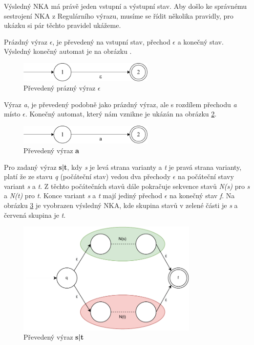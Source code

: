 Výsledný NKA má právě jeden vstupní a výstupní stav. Aby došlo ke správnému sestrojení NKA z Regulárního výrazu, musíme se řídit několika pravidly, pro ukázku si pár těchto pravidel ukážeme.

Prázdný výraz \textit{$\epsilon$}, je převedený na vstupní stav, přechod \textit{$\epsilon$} a konečný stav.
Výsledný konečný automat je na obrázku \label{fig:NFAepsilon}.
\begin{figure}[!h]
	\centering
	\includegraphics[width=0.6\textwidth]{Figures/NFA_epsilon.pdf}
	\caption{Převedený prázný výraz \textbf{$\epsilon$}}
	\label{fig:NFAepsilon}
\end{figure}

Výraz \textit{a}, je převedený podobně jako prázdný výraz, ale s rozdílem přechodu \textit{a} místo \textit{$\epsilon$}.
Konečný automat, který nám vznikne je ukázán na obrázku \ref{fig:NFAa}.
\begin{figure}[!h]
	\centering
	\includegraphics[width=0.6\textwidth]{Figures/NFA_a.pdf}
	\caption{Převedený výraz \textbf{a}}
	\label{fig:NFAa}
\end{figure}

Pro zadaný výraz \textbf{s|t}, kdy \textit{s} je levá strana varianty a \textit{t} je pravá strana varianty, platí že ze stavu \textit{q} (počáteční stav) vedou dva přechody
\textit{$\epsilon$} na počáteční stavy variant \textit{s} a \textit{t}. Z těchto počátečních stavů dále pokračuje sekvence stavů \textit{N(s)} pro \textit{s} a \textit{N(t)} pro \textit{t}.
Konce variant \textit{s} a \textit{t} mají jediný přechod \textit{$\epsilon$} na konečný stav \textit{f}.
Na obrázku \ref{fig:NFAunion} je vyobrazen výsledný NKA, 
kde skupina stavů v zelené části je \textit{s} a červená skupina je \textit{t}.
\begin{figure}[!h]
	\centering
	\includegraphics[width=0.8\textwidth]{Figures/NFA_union.pdf}
	\caption{Převedený výraz \textbf{s|t}}
	\label{fig:NFAunion}
\end{figure}

